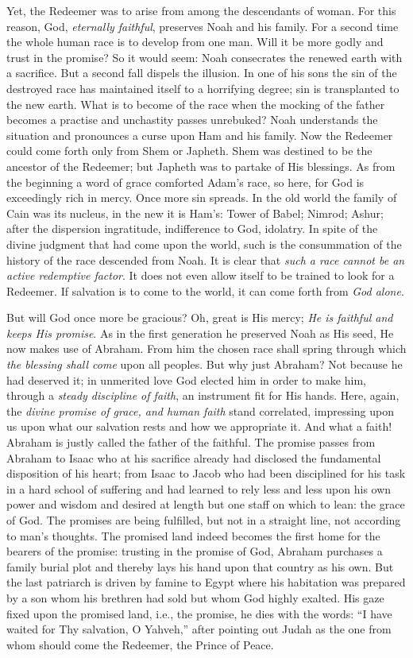Yet, the Redeemer was to arise from among the descendants of woman. For this reason, God, \emph{eternally faithful}, preserves Noah and his family. For a second time the whole human race is to develop from one man. Will it be more godly and trust in the promise? So it would seem: Noah consecrates the renewed earth with a sacrifice. But a second fall dispels the illusion. In one of his sons the sin of the destroyed race has maintained itself to a horrifying degree; sin is transplanted to the new earth. What is to become of the race when the mocking of the father becomes a practise and unchastity passes unrebuked? Noah understands the situation and pronounces a curse upon Ham and his family. Now the Redeemer could come forth only from Shem or Japheth. Shem was destined to be the ancestor of the Redeemer; but Japheth was to partake of His blessings. As from the beginning a word of grace comforted Adam’s race, so here, for God is exceedingly rich in mercy. Once more sin spreads. In the old world the family of Cain was its nucleus, in the new it is Ham’s: Tower of Babel; Nimrod; Ashur; after the dispersion ingratitude, indifference to God, idolatry. In spite of the divine judgment that had come upon the world, such is the consummation of the history of the race descended
from Noah. It is clear that \emph{such a race cannot be an active redemptive factor}. It does not even allow itself to be trained to look for a Redeemer. If salvation is to come to the world, it can come forth from \emph{God alone}.

But will God once more be gracious? Oh, great is His mercy; \emph{He is faithful and keeps His promise}. As in the first generation he preserved Noah as His seed, He now makes use of Abraham. From him the chosen race shall spring through which \emph{the blessing shall come} upon all peoples. But why just Abraham? Not because he had deserved it; in unmerited love God elected him in order to make him, through a \emph{steady discipline of faith}, an instrument fit for His hands. Here, again, the \emph{divine promise of grace, and human faith} stand correlated, impressing upon us upon what our salvation rests and how we appropriate it. And what a faith! Abraham is justly called the father of the faithful. The promise passes from Abraham to Isaac who at his sacrifice already had disclosed the fundamental disposition of his heart; from Isaac to Jacob who had been disciplined for his task in a hard school of suffering and had learned to rely less and less upon his own power and wisdom and desired at length but one staff on which to lean: the grace of God. The promises are being fulfilled, but not in a straight line, not according to man's thoughts. The promised land indeed becomes the first home for the bearers of the promise: trusting in the promise of God, Abraham purchases a family burial plot and thereby lays his hand upon that country as his own. But the last patriarch is driven by famine to Egypt where his habitation was prepared by a son whom his brethren had sold but whom God highly exalted. His gaze fixed upon the promised land, i.e., the promise, he dies with the words: “I have waited for Thy salvation, O Yahveh,” after pointing out Judah as the one from whom should come the Redeemer, the Prince of Peace.

